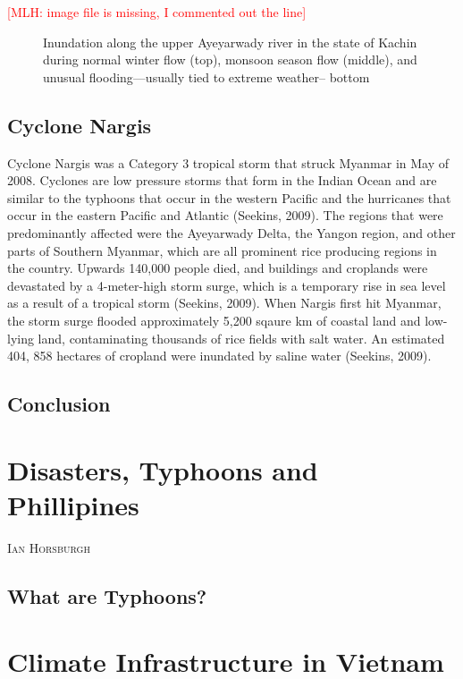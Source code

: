 \documentclass{book}\usepackage{knitr}
\makeatletter
\newcommand{\red}[1]{\textcolor{red}{[MLH: #1]}}
\newcommand{\chapterauthor}[1]{%
  {\parindent0pt\vspace*{-25pt}%
  \linespread{1.1}\large\scshape#1%
  \par\nobreak\vspace*{35pt}}
  \@afterheading%
}
\makeatother
\begin{document}
\red{image file is missing, I commented out the line}
\begin{figure}
\caption{Inundation along the upper Ayeyarwady river in the state of Kachin during normal winter flow (top), monsoon season flow (middle), and unusual flooding—usually tied to extreme weather-- bottom}
\end{figure}

\section{Cyclone Nargis}
Cyclone Nargis was a Category 3 tropical storm that struck Myanmar in May of 2008. Cyclones are low pressure storms that form in the Indian Ocean and are similar to the typhoons that occur in the western Pacific and the hurricanes that occur in the eastern Pacific and Atlantic (Seekins, 2009). The regions that were predominantly affected were the Ayeyarwady Delta, the Yangon region, and other parts of Southern Myanmar, which are all prominent rice producing regions in the country. Upwards 140,000 people died, and buildings and croplands were devastated by a 4-meter-high storm surge, which is a temporary rise in sea level as a result of a tropical storm (Seekins, 2009). 
	When Nargis first hit Myanmar, the storm surge flooded approximately 5,200 sqaure km of coastal land and low-lying land, contaminating thousands of rice fields with salt water. An estimated 404, 858 hectares of cropland were inundated by saline water (Seekins, 2009). 

\section{Conclusion}




\chapter{Disasters, Typhoons and Phillipines}

\chapterauthor{Ian Horsburgh}

\section{What are Typhoons?}



\chapter{Climate Infrastructure in Vietnam}
\end{document}
